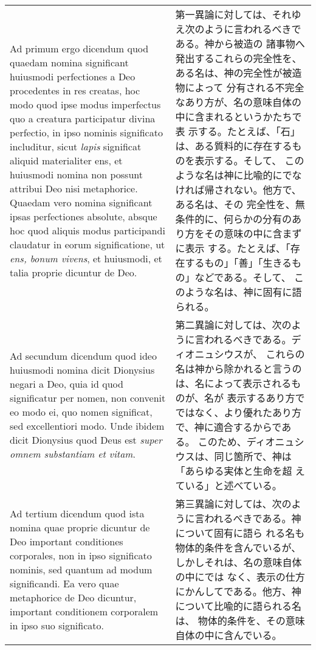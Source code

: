 \documentclass[10pt]{jsarticle} %
\begin{document}
\begin{longtable}{p{21em}p{21em}}
\\




{\sc  Ad primum ergo dicendum} quod quaedam nomina significant
huiusmodi perfectiones a Deo procedentes in res creatas, hoc modo quod
ipse modus imperfectus quo a creatura participatur divina perfectio, in
ipso nominis significato includitur, sicut {\it lapis} significat aliquid
materialiter ens, et huiusmodi nomina non possunt attribui Deo nisi
metaphorice. Quaedam vero nomina significant ipsas perfectiones
absolute, absque hoc quod aliquis modus participandi claudatur in eorum
significatione, ut {\it ens, bonum vivens}, et huiusmodi, et talia proprie
dicuntur de Deo.

&

第一異論に対しては、それゆえ次のように言われるべきである。神から被造の
諸事物へ発出するこれらの完全性を、ある名は、神の完全性が被造物によって
分有される不完全なあり方が、名の意味自体の中に含まれるというかたちで表
示する。たとえば、「石」は、ある質料的に存在するものを表示する。そして、
このような名は神に比喩的にでなければ帰されない。他方で、ある名は、その
完全性を、無条件的に、何らかの分有のあり方をその意味の中に含まずに表示
する。たとえば、「存在するもの」「善」「生きるもの」などである。そして、
このような名は、神に固有に語られる。

\\


{\sc Ad secundum dicendum} quod ideo huiusmodi nomina dicit
Dionysius negari a Deo, quia id quod significatur per nomen, non
convenit eo modo ei, quo nomen significat, sed excellentiori modo. Unde
ibidem dicit Dionysius quod Deus est {\it super omnem substantiam et vitam}.

&

第二異論に対しては、次のように言われるべきである。ディオニュシウスが、
これらの名は神から除かれると言うのは、名によって表示されるものが、名が
表示するあり方でではなく、より優れたあり方で、神に適合するからである。
このため、ディオニュシウスは、同じ箇所で、神は「あらゆる実体と生命を超
えている」と述べている。

\\




{\sc Ad tertium dicendum} quod ista nomina quae proprie dicuntur de Deo
important conditiones corporales, non in ipso significato nominis, sed
quantum ad modum significandi. Ea vero quae metaphorice de Deo dicuntur,
important conditionem corporalem in ipso suo significato.

&

第三異論に対しては、次のように言われるべきである。神について固有に語ら
れる名も物体的条件を含んでいるが、しかしそれは、名の意味自体の中にでは
なく、表示の仕方にかんしてである。他方、神について比喩的に語られる名は、
物体的条件を、その意味自体の中に含んでいる。


\\



\end{longtable}
\end{document}

